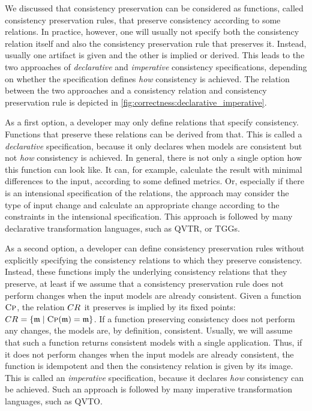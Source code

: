 We discussed that consistency preservation can be considered as functions, called consistency preservation rules, that preserve consistency according to some relations.
In practice, however, one will usually not specify both the consistency relation itself and also the consistency preservation rule that preserves it.
Instead, usually one artifact is given and the other is implied or derived.
This leads to the two approaches of \emph{declarative} and \emph{imperative} consistency specifications, depending on whether the specification defines \emph{how} consistency is achieved.
The relation between the two approaches and a consistency relation and consistency preservation rule is depicted in \autoref{fig:correctness:declarative_imperative}.

As a first option, a developer may only define relations that specify consistency. Functions that preserve these relations can be derived from that.
This is called a \emph{declarative} specification, because it only declares when models are consistent but not \emph{how} consistency is achieved.
In general, there is not only a single option how this function can look like.
It can, for example, calculate the result with minimal differences to the input, according to some defined metrics.
Or, especially if there is an intensional specification of the relations, the approach may consider the type of input change and calculate an appropriate change according to the constraints in the intensional specification.
This approach is followed by many declarative transformation languages, such as \gls{QVTR}, or \glspl{TGG}.

As a second option, a developer can define consistency preservation rules without explicitly specifying the consistency relations to which they preserve consistency.
Instead, these functions imply the underlying consistency relations that they preserve, at least if we assume that a consistency preservation rule does not perform changes when the input models are already consistent.
Given a function $\textsc{Cp}$, the relation $CR_{}$ it preserves is implied by its fixed points: $CR_{} = \{ \mathfrak{m} \mid \textsc{Cp}(\mathfrak{m}) = \mathfrak{m} \}$.
If a function preserving consistency does not perform any changes, the models are, by definition, consistent.
Usually, we will assume that such a function returns consistent models with a single application.
Thus, if it does not perform changes when the input models are already consistent, the function is idempotent and then the consistency relation is given by its image.
This is called an \emph{imperative} specification, because it declares \emph{how} consistency can be achieved.
Such an approach is followed by many imperative transformation languages, such as \gls{QVTO}. %


